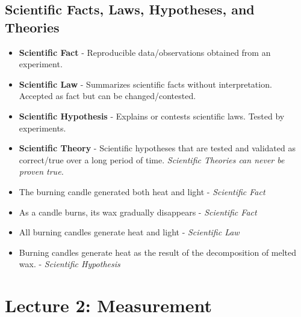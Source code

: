 \begin{minipage}{\textwidth}

\vspace{2em}

\subsection{Scientific Facts, Laws, Hypotheses, and Theories}
\begin{itemize}
	\item \textbf{Scientific Fact} - Reproducible data/observations obtained from an experiment.
	\item \textbf{Scientific Law} - Summarizes scientific facts without interpretation. Accepted as fact but can be changed/contested.
	\item \textbf{Scientific Hypothesis} - Explains or contests scientific laws. Tested by experiments.
	\item \textbf{Scientific Theory} - Scientific hypotheses that are tested and validated as correct/true over a long period of time. \textit{Scientific Theories can never be proven true.}
\end{itemize}

\begin{example}
\begin{itemize}
	\textbf{Facts, Laws, and Theories}
	
	\item The burning candle generated both heat and light - \textit{Scientific Fact}
	\item As a candle burns, its wax gradually disappears - \textit{Scientific Fact}
	\item All burning candles generate heat and light - \textit{Scientific Law}
	\item Burning candles generate heat as the result of the decomposition of melted wax. - \textit{Scientific Hypothesis}
\end{itemize}
\end{example}
\end{minipage}

\section{Lecture 2: Measurement}

